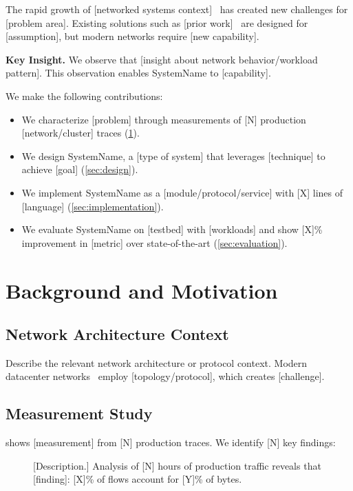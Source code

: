 \documentclass[letterpaper,twocolumn,10pt]{article}
\newcommand{\system}{SystemName\xspace}
\newcommand{\para}[1]{\smallskip\noindent\textbf{#1.}}
\begin{document}
The rapid growth of [networked systems context]~\cite{jain2013b4} has
created new challenges for [problem area]. Existing solutions such as
[prior work]~\cite{alizadeh2010dctcp} are designed for [assumption],
but modern networks require [new capability].

\para{Key Insight}
We observe that [insight about network behavior/workload pattern].
This observation enables \system to [capability].

We make the following contributions:
\begin{itemize}
  \item We characterize [problem] through measurements of [N]
        production [network/cluster] traces (\cref{sec:background}).
  \item We design \system, a [type of system] that leverages
        [technique] to achieve [goal] (\cref{sec:design}).
  \item We implement \system as a [module/protocol/service] with
        [X] lines of [language] (\cref{sec:implementation}).
  \item We evaluate \system on [testbed] with [workloads] and
        show [X]\% improvement in [metric] over state-of-the-art
        (\cref{sec:evaluation}).
\end{itemize}

\section{Background and Motivation}
\label{sec:background}

\subsection{Network Architecture Context}

Describe the relevant network architecture or protocol context.
Modern datacenter networks~\cite{singh2015jupiter, greenberg2009vl2}
employ [topology/protocol], which creates [challenge].

\subsection{Measurement Study}

 shows [measurement] from [N] production traces.
We identify [N] key findings:

\begin{figure}[t]
  \centering
  \caption{[Description.] Analysis of [N] hours of production traffic
    reveals that [finding]: [X]\% of flows account for [Y]\% of bytes.}
  \label{fig:motivation}
\end{figure}
\end{document}
